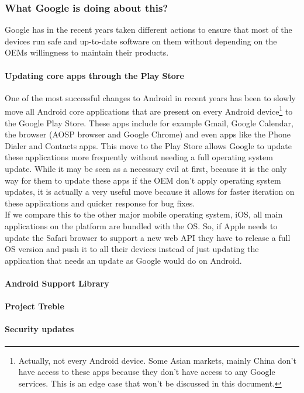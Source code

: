 \documentclass[11pt,a4paper]{report}
\begin{document}
\subsubsection{What Google is doing about this?}
Google has in the recent years taken different actions to ensure that most of the devices run safe and up-to-date software on them without depending on the OEMs willingness to maintain their products.
\paragraph{Updating core apps through the Play Store}
One of the most successful changes to Android in recent years has been to slowly move all Android core applications that are present on every Android device\footnote{Actually, not every Android device. Some Asian markets, mainly China don't have access to these apps because they don't have access to any Google services. This is an edge case that won't be discussed in this document. } to the Google Play Store. These apps include for example Gmail, Google Calendar, the browser (AOSP browser and Google Chrome) and even apps like the Phone Dialer and Contacts apps. This move to the Play Store allows Google to update these applications more frequently without needing a full operating system update. While it may be seen as a necessary evil at first, because it is the only way for them to update these apps if the OEM don't apply operating system updates, it is actually a very useful move because it allows for faster iteration on these applications and quicker response for bug fixes.\\

If we compare this to the other major mobile operating system, iOS, all main applications on the platform are bundled with the OS. So, if Apple needs to update the Safari browser to support a new web API they have to release a full OS version and push it to all their devices instead of just updating the application that needs an update as Google would do on Android.
\paragraph{Android Support Library}
\paragraph{Project Treble}
\paragraph{Security updates}
\end{document}
